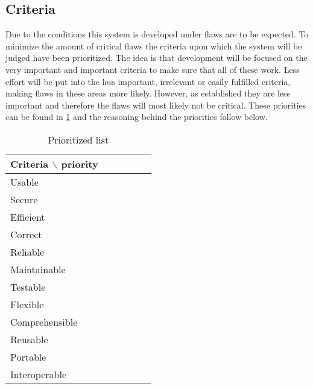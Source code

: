 \subsection{Criteria}
Due to the conditions this system is developed under flaws are to be expected. 
To minimize the amount of critical flaws the criteria \citep[p.~180]{Rod-Aalborg} upon which the system will be judged have been prioritized.
The idea is that development will be focused on the very important and important criteria to make sure that all of these work.
Less effort will be put into the less important, irrelevant or easily fulfilled criteria, making flaws in these areas more likely.
However, as established they are less important and therefore the flaws will most likely not be critical.
These priorities can be found in \cref{fig:criteria} and the reasoning behind the priorities follow below.



\begin{table}[H]
	\begin{center}
		\begin{tabular}{|l|c|c|c|c|c|}
			\hline
			Criteria $\backslash$ priority & \rotatebox{90}{Very important} &  \rotatebox{90}{Important} & \rotatebox{90}{Less important} & \rotatebox{90}{Irrelevant} & \rotatebox{90}{Easily fulfilled}\\
			\hline
			Usable & \xmark & & & & \\
			\hline
			Secure & & & & \xmark & \\
			\hline
			Efficient & & & & & \xmark \\
			\hline
			Correct & & \xmark & & & \\
			\hline
			Reliable & \xmark & & & & \\
			\hline
			Maintainable & & & \xmark & & \\
			\hline
			Testable & & \xmark & & & \\
			\hline
			Flexible & & & & \xmark & \\
			\hline
			Comprehensible & & \xmark & & & \\
			\hline
			Reusable & & & \xmark & & \\
			\hline
			Portable & & & & \xmark & \\
			\hline
			Interoperable & & & & \xmark & \\
			\hline
		\end{tabular}
	\end{center}
	\caption{Prioritized list}\label{fig:criteria}
\end{table}


